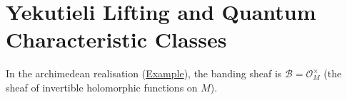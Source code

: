 \section{Yekutieli Lifting and Quantum Characteristic Classes}
\label{sec:yekutieli-lifting}

\begin{remark}
  \label{rem:yekutieli-archimedean-band}
In the archimedean realisation
(\hyperref[def:c-quantum-observable-universe]{Example}), the banding sheaf is
$\mathcal{B} = \mathcal{O}_M^{\times}$ (the sheaf of invertible
holomorphic functions on $M$).
\end{remark}

